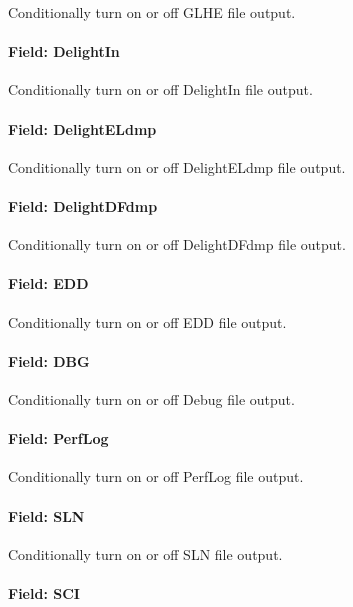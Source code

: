 Conditionally turn on or off GLHE file output.

\paragraph{Field: DelightIn}\label{field-delight-in}

Conditionally turn on or off DelightIn file output.

\paragraph{Field: DelightELdmp}\label{field-delight-el-dmp}

Conditionally turn on or off DelightELdmp file output.

\paragraph{Field: DelightDFdmp}\label{field-delight-df-dmp}

Conditionally turn on or off DelightDFdmp file output.

\paragraph{Field: EDD}\label{field-edd}

Conditionally turn on or off EDD file output.

\paragraph{Field: DBG}\label{field-dbg}

Conditionally turn on or off Debug file output.

\paragraph{Field: PerfLog}\label{field-perf-log}

Conditionally turn on or off PerfLog file output.

\paragraph{Field: SLN}\label{field-sln}

Conditionally turn on or off SLN file output.

\paragraph{Field: SCI}\label{field-sci}

